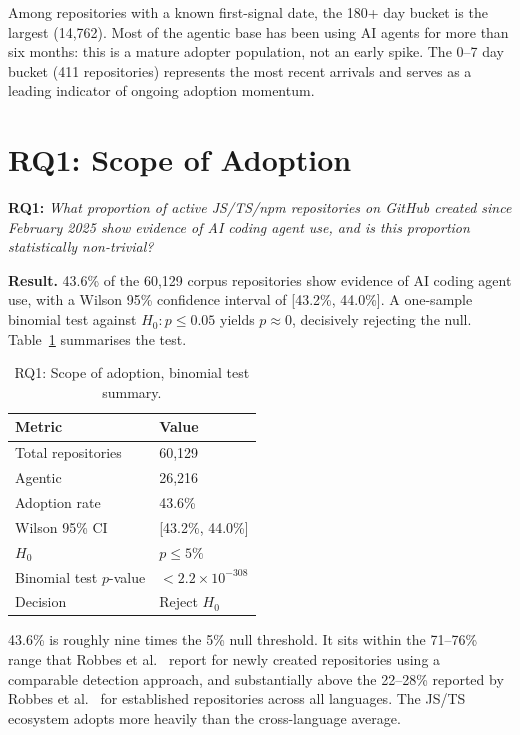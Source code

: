 Among repositories with a known first-signal date, the 180+ day bucket is the largest (14,762). Most of the agentic base has been using AI agents for more than six months: this is a mature adopter population, not an early spike. The 0--7 day bucket (411 repositories) represents the most recent arrivals and serves as a leading indicator of ongoing adoption momentum.

\section{RQ1: Scope of Adoption}
\label{sec:res:rq1}

\textbf{RQ1:} \textit{What proportion of active JS/TS/npm repositories on GitHub created since February 2025 show evidence of AI coding agent use, and is this proportion statistically non-trivial?}

\medskip

\noindent\textbf{Result.} 43.6\% of the 60,129 corpus repositories show evidence of AI coding agent use, with a Wilson 95\% confidence interval of [43.2\%, 44.0\%]. A one-sample binomial test against $H_0: p \leq 0.05$ yields $p \approx 0$, decisively rejecting the null. Table~\ref{tab:rq1} summarises the test.

\begin{table}[h]
\centering
\caption{RQ1: Scope of adoption, binomial test summary.}
\label{tab:rq1}
\begin{tabular}{@{}ll@{}}
\toprule
Metric & Value \\
\midrule
Total repositories          & 60,129 \\
Agentic                     & 26,216 \\
Adoption rate               & 43.6\% \\
Wilson 95\% CI              & [43.2\%, 44.0\%] \\
$H_0$                       & $p \leq 5\%$ \\
Binomial test $p$-value     & $<\!2.2 \times 10^{-308}$ \\
Decision                    & Reject $H_0$ \\
\bottomrule
\end{tabular}
\end{table}

43.6\% is roughly nine times the 5\% null threshold. It sits within the 71--76\% range that Robbes et al.~\cite{robbesAgenticVery2026} report for newly created repositories using a comparable detection approach, and substantially above the 22--28\% reported by Robbes et al.~\cite{robbesAgenticMuch2026} for established repositories across all languages. The JS/TS ecosystem adopts more heavily than the cross-language average.

